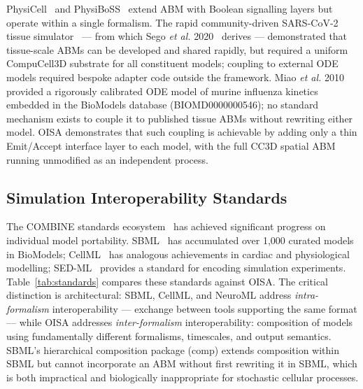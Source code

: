 \documentclass[conference,letterpaper,10pt]{IEEEtran}
\begin{document}
PhysiCell~\cite{ghaffarizadeh2018physicell} and
PhysiBoSS~\cite{ponce2023physiboss} extend ABM with Boolean signalling
layers but operate within a single formalism. The rapid
community-driven SARS-CoV-2 tissue simulator~\cite{getz2020sarscov2}
--- from which Sego \emph{et al.} 2020~\cite{sego2020modular} derives
--- demonstrated that tissue-scale ABMs can be developed and shared
rapidly, but required a uniform CompuCell3D substrate for all
constituent models; coupling to external ODE models required bespoke
adapter code outside the framework. Miao \emph{et
al.} 2010~\cite{miao2010influenza} provided a rigorously calibrated ODE
model of murine influenza kinetics embedded in the BioModels database
(BIOMD0000000546); no standard mechanism exists to couple it to
published tissue ABMs without rewriting either model. OISA demonstrates
that such coupling is achievable by adding only a thin Emit/Accept
interface layer to each model, with the full CC3D spatial ABM running
unmodified as an independent process.

\subsection{Simulation Interoperability Standards}

The COMBINE standards ecosystem~\cite{bergmann2014combine} has achieved
significant progress on individual model portability.
SBML~\cite{hucka2015sbml} has accumulated over 1{,}000 curated models in
BioModels; CellML~\cite{clerx2020cellml} has analogous achievements in
cardiac and physiological modelling; SED-ML~\cite{waltemath2011sedml}
provides a standard for encoding simulation experiments. Table~\ref{tab:standards}
compares these standards against OISA. The critical distinction is
architectural: SBML, CellML, and NeuroML address \emph{intra-formalism}
interoperability --- exchange between tools supporting the same format
--- while OISA addresses \emph{inter-formalism} interoperability:
composition of models using fundamentally different formalisms,
timescales, and output semantics. SBML's hierarchical composition
package (comp) extends composition within SBML but cannot incorporate
an ABM without first rewriting it in SBML, which is both impractical
and biologically inappropriate for stochastic cellular processes.
\end{document}
